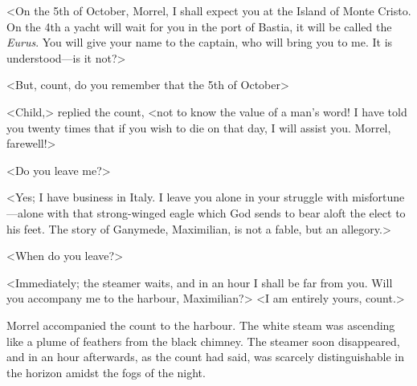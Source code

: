  <On the 5th of October, Morrel, I shall expect you at the Island of Monte Cristo. On the 4th a yacht will wait for you in the port of Bastia, it will be called the \textit{Eurus}. You will give your name to the captain, who will bring you to me. It is understood—is it not?> 

 <But, count, do you remember that the 5th of October\longdash> 

 <Child,> replied the count, <not to know the value of a man's word! I have told you twenty times that if you wish to die on that day, I will assist you. Morrel, farewell!> 

 <Do you leave me?> 

 <Yes; I have business in Italy. I leave you alone in your struggle with misfortune—alone with that strong-winged eagle which God sends to bear aloft the elect to his feet. The story of Ganymede, Maximilian, is not a fable, but an allegory.> 

 <When do you leave?> 

 <Immediately; the steamer waits, and in an hour I shall be far from you. Will you accompany me to the harbour, Maximilian?>  <I am entirely yours, count.> 

 Morrel accompanied the count to the harbour. The white steam was ascending like a plume of feathers from the black chimney. The steamer soon disappeared, and in an hour afterwards, as the count had said, was scarcely distinguishable in the horizon amidst the fogs of the night. 